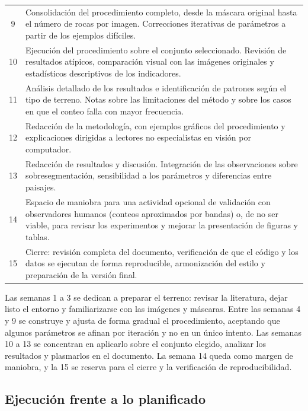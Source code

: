 \begin{longtable}{@{}cp{12.4cm}@{}}
  9 & Consolidación del procedimiento completo, desde la máscara original hasta el número
      de rocas por imagen. Correcciones iterativas de parámetros a partir de los ejemplos
      difíciles. \\
  10 & Ejecución del procedimiento sobre el conjunto seleccionado. Revisión de resultados
      atípicos, comparación visual con las imágenes originales y estadísticos descriptivos
      de los indicadores. \\
  11 & Análisis detallado de los resultados e identificación de patrones según el tipo de
      terreno. Notas sobre las limitaciones del método y sobre los casos en que el conteo
      falla con mayor frecuencia. \\
  12 & Redacción de la metodología, con ejemplos gráficos del procedimiento y explicaciones
      dirigidas a lectores no especialistas en visión por computador. \\
  13 & Redacción de resultados y discusión. Integración de las observaciones sobre
      sobresegmentación, sensibilidad a los parámetros y diferencias entre paisajes. \\
  14 & Espacio de maniobra para una actividad opcional de validación con observadores
      humanos (conteos aproximados por bandas) o, de no ser viable, para revisar los
      experimentos y mejorar la presentación de figuras y tablas. \\
  15 & Cierre: revisión completa del documento, verificación de que el código y los datos
      se ejecutan de forma reproducible, armonización del estilo y preparación de la
      versión final. \\
\end{longtable}

Las semanas 1 a 3 se dedican a preparar el terreno: revisar la literatura, dejar listo el
entorno y familiarizarse con las imágenes y máscaras. Entre las semanas 4 y 9 se construye
y ajusta de forma gradual el procedimiento, aceptando que algunos parámetros se afinan por
iteración y no en un único intento. Las semanas 10 a 13 se concentran en aplicarlo sobre el
conjunto elegido, analizar los resultados y plasmarlos en el documento. La semana 14 queda
como margen de maniobra, y la 15 se reserva para el cierre y la verificación de
reproducibilidad.

\subsection*{Ejecución frente a lo planificado}

